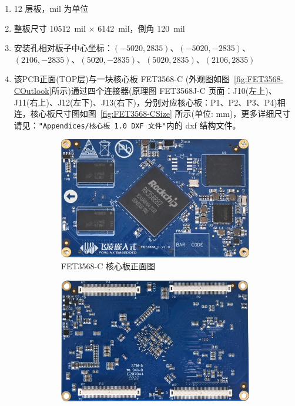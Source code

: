 \bigskip
\begin{enumerate}
  \item 12 层板，mil 为单位
  \item 整板尺寸 \SI{10512}{mil} $\times$ \SI{6142}{mil}，倒角 \SI{120}{mil}
  \item 安装孔相对板子中心坐标：$(-5020, 2835)$、$(-5020, -2835)$、$(2106, -2835)$、$(5020, -2835)$、$(5020, 2835)$、$(2106, 2835)$
  \item 该PCB正面(TOP层)与一块核心板 FET3568-C (外观图如图~\ref{fig:FET3568-COutlook}所示)通过四个连接器(原理图 FET3568J-C 页面：J10(左上)、J11(右上)、J12(左下)、J13(右下)，分别对应核心板：P1、P2、P3、P4)相连，核心板尺寸图如图~\ref{fig:FET3568-CSize} 所示(单位: mm)，更多详细尺寸请见：\verb|"Appendices/核心板 1.0 DXF 文件"|内的 dxf 结构文件。
  \begin{figure}
    \centering
    \begin{subfigure}{0.8\textwidth}
      \centering
      \includegraphics[width=\textwidth]{./figures/FET3568-C核心板外观图TOP.png}
      \caption{FET3568-C 核心板正面图}
      \label{fig:FET3568-COutlookTop}
    \end{subfigure}
    \begin{subfigure}{0.8\textwidth}
      \centering
      \includegraphics[width=\textwidth]{./figures/FET3568-C核心板外观图BOTTOM.png}

\end{subfigure}
\end{figure}
\end{enumerate}
